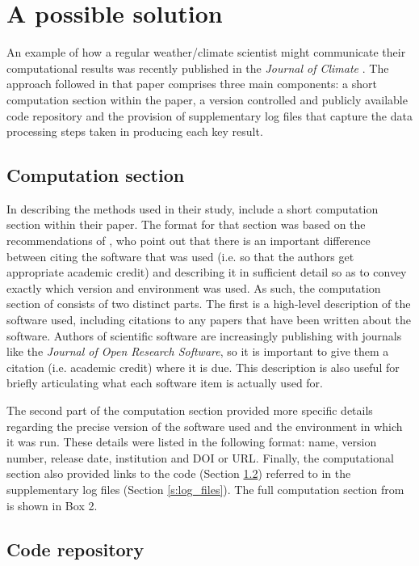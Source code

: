 \section{A possible solution}

An example of how a regular weather/climate scientist might communicate their computational results was recently published in the \textit{Journal of Climate} \citep{Irving2015}. The approach followed in that paper comprises three main components: a short computation section within the paper, a version controlled and publicly available code repository and the provision of supplementary log files that capture the data processing steps taken in producing each key result. 

\subsection{Computation section}

In describing the methods used in their study, \citet{Irving2015} include a short computation section within their paper. The format for that section was based on the recommendations of \citet{Jackson2012}, who point out that there is an important difference between citing the software that was used (i.e. so that the authors get appropriate academic credit) and describing it in sufficient detail so as to convey exactly which version and environment was used. As such, the computation section of \citet{Irving2015} consists of two distinct parts. The first is a high-level description of the software used, including citations to any papers that have been written about the software. Authors of scientific software are increasingly publishing with journals like the \textit{Journal of Open Research Software}, so it is important to give them a citation (i.e. academic credit) where it is due. This description is also useful for briefly articulating what each software item is actually used for.

The second part of the computation section provided more specific details regarding the precise version of the software used and the environment in which it was run. These details were listed in the following format: name, version number, release date, institution and DOI or URL. Finally, the computational section also provided links to the code (Section \ref{s:code_repo}) referred to in the supplementary log files (Section \ref{s:log_files}). The full computation section from \citet{Irving2015} is shown in Box 2.  

\subsection{Code repository}\label{s:code_repo}

